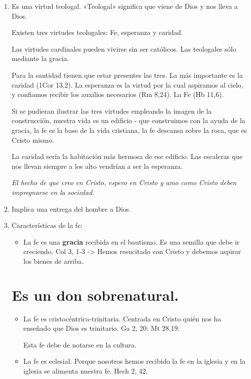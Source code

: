 \documentclass[a4paper,12pt,oneside]{article}
\begin{document}
\begin{enumerate}
    \item Es una virtud teologal. «Teologal» significa que viene de Dios y nos lleva a Dios.

    Existen tres virtudes teologales: Fe, esperanza y caridad.

    Las virtudes cardinales pueden vivirse sin ser católicos. Las teologales sólo mediante la gracia.

    Para la santidad tienen que estar presentes las tres. La más importante es la caridad (1Cor 13,2). La esperanza es la virtud por la cual aspiramos al cielo, y confiamos recibir los auxilios necesarios (Rm 8,24). La Fe (Hb 11,6).

    Si se pudieran ilustrar las tres virtudes empleando la imagen de la construcción, nuestra vida es un edificio - que construimos con la ayuda de la gracia, la fe es la base de la vida cristiana, la fe descansa sobre la roca, que es Cristo mismo.

    La caridad sería la habitación más hermosa de ese edificio. Las escaleras que nos llevan siempre a los alto vendrían a ser la esperanza.

    \textit{El hecho de que creo en Cristo, espero en Cristo y amo como Cristo deben impregnarse en la sociedad.}

    \item Implica una entrega del hombre a Dios.

    \item Características de la fe:
    \begin{itemize}
        \item La fe es una \textbf{gracia} recibida en el bautismo. Es una semilla que debe ir creciendo. Col 3, 1-3 -> Hemos resucitado con Cristo y debemos aspirar los bienes de arriba.
    \end{itemize}

\section*{Es un don sobrenatural.}

    \begin{itemize}
        \item La fe es cristocéntrica-trinitaria. Centrada en Cristo quién nos ha enseñado que Dios es trinitario. Ga 2, 20; Mt 28,19.

        Esta fe debe de notarse en la cultura.

        \item La fe es eclesial. Porque nosotros hemos recibido la fe en la iglesia y en la iglesia se alimenta nuestra fe. Hech 2, 42.


\end{itemize}
\end{enumerate}
\end{document}
